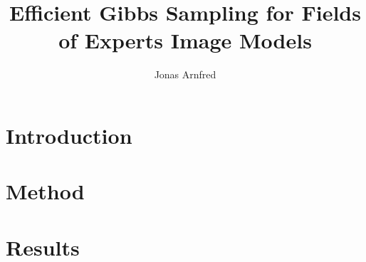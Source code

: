 \documentclass{article}
\begin{document}
\title{Efficient Gibbs Sampling for Fields of Experts Image Models}

\author{Jonas Arnfred \\ }

\maketitle

\section{Introduction}

\section{Method}








\section{Results}

\end{document}
